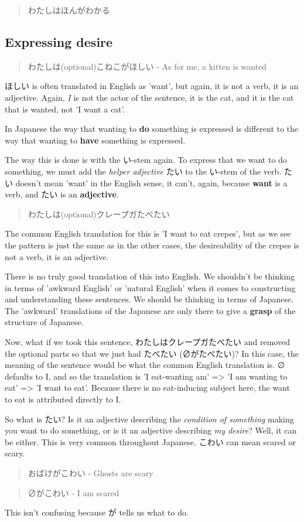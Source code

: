 \documentclass[11pt]{article}
\begin{document}
\begin{quote}
わたしはほんがわかる
\end{quote}
\subsection{Expressing desire}
\label{sec:org526e378}
\begin{quote}
わたしは(optional)こねこがほしい - As for me, a kitten is wanted
\end{quote}
ほしい is often translated in English as 'want', but again, it is not a verb, it is an adjective. Again, \emph{I} is not the actor of the sentence, it is the cat, and it is the cat that is wanted, not 'I want a cat'.

In Japanese the way that wanting to \textbf{do} something is expressed is different to the way that wanting to \textbf{have} something is expressed.

The way this is done is with the い-stem again. To express that we want to do something, we must add the \emph{helper adjective} たい to the い-stem of the verb. たい doesn't mean 'want' in the English sense, it can't, again, because \textbf{want} is a verb, and たい is an \textbf{adjective}.
\begin{quote}
わたしは(optional)クレープガたべたい
\end{quote}
The common English translation for this is 'I want to eat crepes', but as we see the pattern is just the same as in the other cases, the desireability of the crepes is not a verb, it is an adjective.

There is no truly good translation of this into English. We shouldn't be thinking in terms of 'awkward English' or 'natural English' when it comes to constructing and understanding these sentences. We should be thinking in terms of Japanese. The 'awkward' translations of the Japanese are only there to give a \textbf{grasp} of the structure of Japanese.

Now, what if we took this sentence, わたしはクレープガたべたい and removed the optional parts so that we just had たべたい (∅がたべたい)? In this case, the meaning of the sentence would be what the common English translation is. ∅ defaults to I, and so the translation is 'I eat-wanting am' => 'I am wanting to eat' => 'I want to eat'. Because there is no eat-inducing subject here, the want to eat is attributed directly to I.

So what is たい? Is it an adjective describing the \emph{condition of something} making you want to do something, or is it an adjective describing \emph{my desire}? Well, it can be either. This is very common throughout Japanese. こわい can mean scared or scary.
\begin{quote}
おばけがこわい - Ghosts are scary
\end{quote}
\begin{quote}
∅がこわい - I am scared
\end{quote}
This isn't confusing because が tells us what to do.
\end{document}
